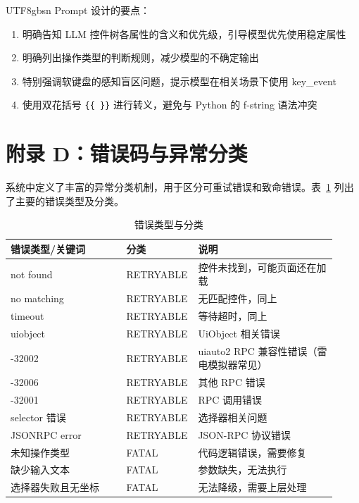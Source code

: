 \documentclass{article}
\begin{document}
\begin{CJK}{UTF8}{gbsn}
Prompt 设计的要点：
\begin{enumerate}[leftmargin=1.5em]
  \item 明确告知 LLM 控件树各属性的含义和优先级，引导模型优先使用稳定属性
  \item 明确列出操作类型的判断规则，减少模型的不确定输出
  \item 特别强调软键盘的感知盲区问题，提示模型在相关场景下使用 key\_event
  \item 使用双花括号 \texttt{\{\{ \}\}} 进行转义，避免与 Python 的 f-string 语法冲突
\end{enumerate}

\section*{附录 D：错误码与异常分类}

系统中定义了丰富的异常分类机制，用于区分可重试错误和致命错误。表~\ref{tab:error_codes} 列出了主要的错误类型及分类。

\begin{table}[h]
  \centering
  \caption{错误类型与分类}
  \label{tab:error_codes}
  \begin{tabular}{p{0.35\linewidth}p{0.15\linewidth}p{0.42\linewidth}}
    \toprule
    错误类型/关键词 & 分类 & 说明 \\
    \midrule
    not found & RETRYABLE & 控件未找到，可能页面还在加载 \\
    no matching & RETRYABLE & 无匹配控件，同上 \\
    timeout & RETRYABLE & 等待超时，同上 \\
    uiobject & RETRYABLE & UiObject 相关错误 \\
    -32002 & RETRYABLE & uiauto2 RPC 兼容性错误（雷电模拟器常见）\\
    -32006 & RETRYABLE & 其他 RPC 错误 \\
    -32001 & RETRYABLE & RPC 调用错误 \\
    selector 错误 & RETRYABLE & 选择器相关问题 \\
    JSONRPC error & RETRYABLE & JSON-RPC 协议错误 \\
    \midrule
    未知操作类型 & FATAL & 代码逻辑错误，需要修复 \\
    缺少输入文本 & FATAL & 参数缺失，无法执行 \\
    选择器失败且无坐标 & FATAL & 无法降级，需要上层处理 \\
    \bottomrule
  \end{tabular}
\end{table}


\end{CJK}
\end{document}
